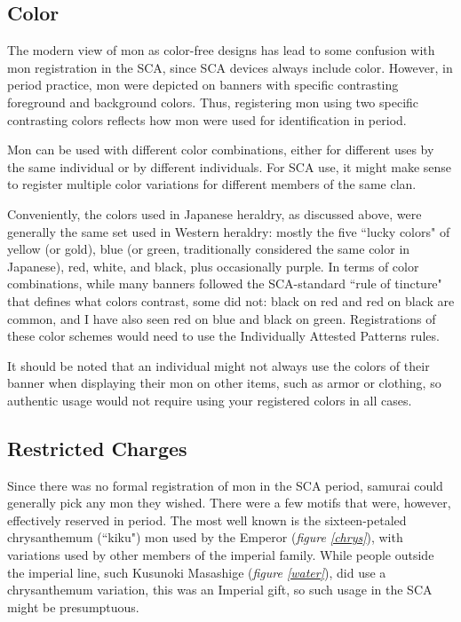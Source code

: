 \documentclass{article}
\begin{document}
\subsection{Color}

  The modern view of mon as color-free designs has lead to some
  confusion with mon registration in the SCA, since SCA devices always
  include color.  However, in period practice, mon were depicted on
  banners with specific contrasting foreground and background colors.
  Thus, registering mon using two specific contrasting colors reflects
  how mon were used for identification in period.

  Mon can be used with different color combinations, either for
  different uses by the same individual or by different individuals.
  For SCA use, it might make sense to register multiple color
  variations for different members of the same clan.

  Conveniently, the colors used in Japanese heraldry, as discussed
  above, were generally the same set used in Western heraldry: mostly
  the five ``lucky colors" of yellow (or gold), blue (or green, traditionally
  considered the same color in Japanese), red, white, and
  black, plus occasionally purple.  In terms of color combinations,
  while many banners followed the SCA-standard ``rule of tincture"
  that defines what colors contrast, some did not: black on red and
  red on black are common, and I have also seen
  red on blue and black on
  green.  Registrations of these color schemes
  would need to use the Individually Attested Patterns rules.

  It should be noted that an individual might not always use the
  colors of their banner when displaying their mon on other items,
  such as armor or clothing, so authentic usage would not require
  using your registered colors in all cases.

\subsection{Restricted Charges}

  Since there was no formal registration of mon in the SCA period,
  samurai could generally pick any mon they wished.  There were a few motifs
  that were, however, effectively reserved in period.  The most well
  known is the sixteen-petaled chrysanthemum (``kiku") mon used
  by the Emperor (\emph{figure \ref{chrys}}), with variations used by other members of the
  imperial family. While people
  outside the imperial line, such Kusunoki Masashige (\emph{figure \ref{water}}), did use a
  chrysanthemum variation, this was an Imperial gift,
  so such usage in the SCA might be presumptuous.
\end{document}

